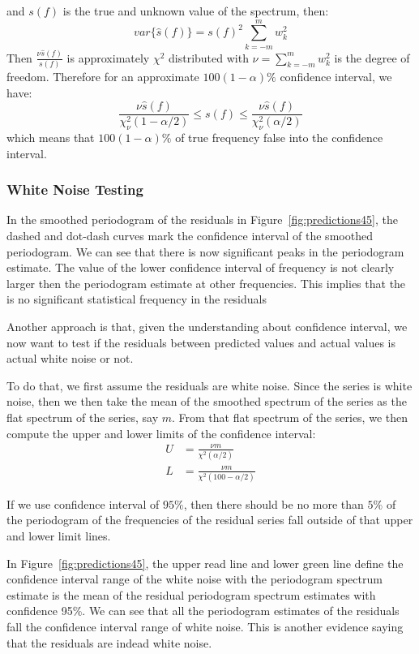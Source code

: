 \documentclass[12pt]{article}
\begin{document}
and $s(f)$ is the true and unknown value of the spectrum, then:
\begin{equation}
var\{\hat{s}(f)\}=s(f)^2\sum_{k=-m}^mw_k^2
\end{equation}
Then
$\frac{\nu \hat{s}(f)}{s(f)}$ is approximately $\chi^2$ distributed with
$\nu=\sum_{k=-m}^mw_k^2$ is the degree of freedom. Therefore for an approximate
$100(1-\alpha)\%$ confidence interval, we have:
\begin{equation}\label{eqn:confidenceInterval}
\frac{\nu\hat{s}(f)}{\chi_{\nu}^2(1-\alpha/2)}\leq s(f)\leq
\frac{\nu\hat{s}(f)}{\chi_{\nu}^2(\alpha/2)}
\end{equation}
which means that $100(1-\alpha)\%$ of true frequency false into the confidence
interval.
\subsubsection{White Noise Testing}
In the smoothed periodogram of the residuals in Figure~\ref{fig:predictions45},
the dashed and dot-dash curves mark the confidence interval of the smoothed
periodogram. We can see that there is now significant peaks in the periodogram
estimate. The value of the lower confidence interval of frequency is not clearly
larger then the periodogram estimate at other frequencies. This implies that the
is no significant statistical frequency in the residuals~\cite{CryerTimeSeries}

Another approach is that, given the understanding about confidence interval, we
now want to test if the residuals between predicted values and actual values is
actual white noise or not.

To do that, we first assume the residuals are white noise. Since the series is
white noise, then we then take the mean of the smoothed spectrum of the series
as the flat spectrum of the series, say $m$. From that flat spectrum of the
series, we then compute the upper and lower limits of the confidence interval:
\begin{align}
U &= \frac{\nu m}{\chi^2(\alpha/2)}\\
L &= \frac{\nu m}{\chi^2(100-\alpha/2)}
\end{align}

If we use confidence interval of $95\%$, then there should be no more than $5\%$
of the periodogram of the frequencies of the residual series fall outside of
that upper and lower limit lines.

In Figure~\ref{fig:predictions45}, the upper read line and lower green line
define the confidence interval range of the white noise with the periodogram
spectrum estimate is the mean of the residual periodogram spectrum estimates with
confidence 95\%. We can see that all the periodogram estimates of the residuals
fall the confidence interval range of white noise. This is another evidence
saying that the residuals are indead white noise.
\end{document}
